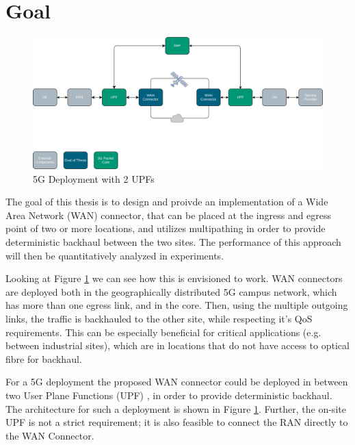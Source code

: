 
\section{Goal}
\label{sec:goal}

\begin{figure}[h]
    \centering
        \includegraphics[width=\textwidth]{fig/telco-use-case-2.png}
        \caption{5G Deployment with 2 UPFs}
        \label{fig:telco}
\end{figure}

The goal of this thesis is to design and proivde an implementation of a Wide Area Network (WAN) connector, that can be placed at the ingress and egress point of two or more locations, and utilizes multipathing in order to provide deterministic backhaul between the two sites. The performance of this approach will then be quantitatively analyzed in experiments.

Looking at Figure \ref{fig:telco} we can see how this is envisioned to work. WAN connectors are deployed both in the geographically distributed 5G campus network, which has more than one egress link, and in the core. Then, using the multiple outgoing links, the traffic is backhauled to the other site, while respecting it's QoS requirements. This can be especially beneficial for critical applications (e.g. between industrial sites), which are in locations that do not have access to optical fibre for backhaul.

For a 5G deployment the proposed WAN connector could be deployed in between two User Plane Functions (UPF) , in order to provide deterministic backhaul. The architecture for such a deployment is shown in Figure \ref{fig:telco}. Further, the on-site UPF is not a strict requirement; it is also feasible to connect the RAN directly to the WAN Connector.


